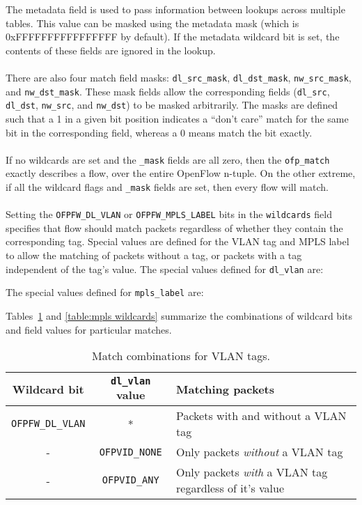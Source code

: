 The metadata field is used to pass information between lookups across multiple tables. This value can be masked using the metadata mask (which is 0xFFFFFFFFFFFFFFFF by default). If the metadata wildcard bit is set, the contents of these fields are ignored in the lookup.
\\\\
There are also four match field masks: \verb|dl_src_mask|, \verb|dl_dst_mask|, \verb|nw_src_mask|, and \verb|nw_dst_mask|. These mask fields allow the corresponding fields (\verb|dl_src|, \verb|dl_dst|, \verb|nw_src|, and \verb|nw_dst|) to be masked arbitrarily. The masks are defined such that a 1 in a given bit position indicates a ``don't care'' match for the same bit in the corresponding field, whereas a 0 means match the bit exactly.
\\\\
If no wildcards are set and the \verb|_mask| fields are all zero, then the \verb|ofp_match| exactly describes a flow, over the entire OpenFlow n-tuple.  On the other extreme, if all the wildcard flags and \verb|_mask| fields are set, then every flow will match.
\\\\
Setting the \verb|OFPFW_DL_VLAN| or \verb|OFPFW_MPLS_LABEL| bits in the \verb|wildcards| field specifies that flow should match packets regardless of whether they contain the corresponding tag. Special values are defined for the VLAN tag and MPLS label to allow the matching of packets without a tag, or packets with a tag independent of the tag's value. The special values defined for \verb|dl_vlan| are:

The special values defined for \verb|mpls_label| are:

Tables~\ref{table:vlan wildcards} and \ref{table:mpls wildcards} summarize the combinations of wildcard bits and field values for particular matches.

\begin{table}[hbp]
\centering
\begin{tabularx}{\textwidth}{|c|c|X|}
\hline
Wildcard bit & \verb|dl_vlan| value & Matching packets \\
\hline
\verb|OFPFW_DL_VLAN| & * & Packets with and without a VLAN tag \\
\hline
- & \verb|OFPVID_NONE| & Only packets \emph{without} a VLAN tag \\
\hline
- & \verb|OFPVID_ANY| & Only packets \emph{with} a VLAN tag regardless of it's value \\
\hline
\end{tabularx}
\caption{Match combinations for VLAN tags.}
\label{table:vlan wildcards}
\end{table}

